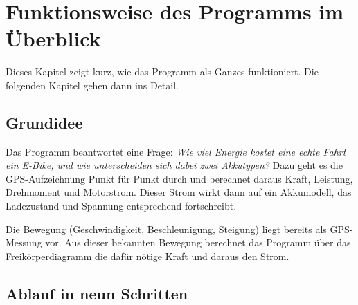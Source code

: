 \chapter{Funktionsweise des Programms im Überblick}
\label{ch:funktionsweise}

Dieses Kapitel zeigt kurz, wie das Programm als Ganzes funktioniert. Die folgenden Kapitel gehen dann ins Detail.

\section{Grundidee}

Das Programm beantwortet eine Frage: \emph{Wie viel Energie kostet eine echte Fahrt ein E-Bike, und wie unterscheiden sich dabei zwei Akkutypen?} Dazu geht es die GPS-Aufzeichnung Punkt für Punkt durch und berechnet daraus Kraft, Leistung, Drehmoment und Motorstrom. Dieser Strom wirkt dann auf ein Akkumodell, das Ladezustand und Spannung entsprechend fortschreibt.

Die Bewegung (Geschwindigkeit, Beschleunigung, Steigung) liegt bereits als GPS-Messung vor. Aus dieser bekannten Bewegung berechnet das Programm über das Freikörperdiagramm die dafür nötige Kraft und daraus den Strom.

\section{Ablauf in neun Schritten}

